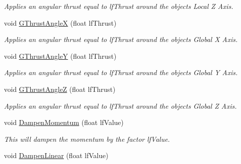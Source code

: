 \begin{DoxyCompactItemize}
\begin{DoxyCompactList}\small\item\em Applies an angular thrust equal to lfThrust around the objects Local Z Axis. \end{DoxyCompactList}\item 
\hypertarget{classc_momentum_a0ef0aa6ac876af22bee53e282afefb08}{
void \hyperlink{classc_momentum_a0ef0aa6ac876af22bee53e282afefb08}{GThrustAngleX} (float lfThrust)}
\label{classc_momentum_a0ef0aa6ac876af22bee53e282afefb08}

\begin{DoxyCompactList}\small\item\em Applies an angular thrust equal to lfThrust around the objects Global X Axis. \end{DoxyCompactList}\item 
\hypertarget{classc_momentum_a827f3bb427dd88bac9f6c80979d07b45}{
void \hyperlink{classc_momentum_a827f3bb427dd88bac9f6c80979d07b45}{GThrustAngleY} (float lfThrust)}
\label{classc_momentum_a827f3bb427dd88bac9f6c80979d07b45}

\begin{DoxyCompactList}\small\item\em Applies an angular thrust equal to lfThrust around the objects Global Y Axis. \end{DoxyCompactList}\item 
\hypertarget{classc_momentum_aac5e91e4596061bdd1a21acf7feee224}{
void \hyperlink{classc_momentum_aac5e91e4596061bdd1a21acf7feee224}{GThrustAngleZ} (float lfThrust)}
\label{classc_momentum_aac5e91e4596061bdd1a21acf7feee224}

\begin{DoxyCompactList}\small\item\em Applies an angular thrust equal to lfThrust around the objects Global Z Axis. \end{DoxyCompactList}\item 
\hypertarget{classc_momentum_a7568fcd711837d2e0b1b90d19fa5069a}{
void \hyperlink{classc_momentum_a7568fcd711837d2e0b1b90d19fa5069a}{DampenMomentum} (float lfValue)}
\label{classc_momentum_a7568fcd711837d2e0b1b90d19fa5069a}

\begin{DoxyCompactList}\small\item\em This will dampen the momentum by the factor lfValue. \end{DoxyCompactList}\item 
\hypertarget{classc_momentum_abf82f78ae14d7953be37fc13f066babc}{
void \hyperlink{classc_momentum_abf82f78ae14d7953be37fc13f066babc}{DampenLinear} (float lfValue)}
\label{classc_momentum_abf82f78ae14d7953be37fc13f066babc}


\end{DoxyCompactItemize}
